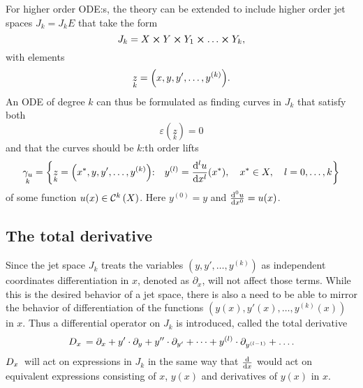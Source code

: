 For higher order ODE:s, the theory can be extended to include higher order jet spaces \(J_k = J_k E\) that take the form
\begin{equation}
  J_k = X \cross Y \cross Y_1 \cross \dots \cross Y_k,
\end{equation}
with elements
\begin{equation}
  \underset{k}{z} = \qty(x, y, y', \dots, y^{(k)}).
\end{equation}
An ODE of degree \(k\) can thus be formulated as finding curves in \(J_k\) that satisfy both
\begin{equation}
  \varepsilon(\underset{k}{z}) = 0
\end{equation}
and that the curves should be \(k\):th order lifts
\begin{equation}
  \underset{k}{\gamma_u} = \qty{\underset{k}{z} = \qty(\fixed{x}, y, y', \dots, y^{(k)})\qq*{:} y^{(l)} = \dv[l]{u}{x}{(\fixed{x})}\qc \fixed{x} \in X\qc l = 0, \dots, k}
\end{equation}
of some function \(u(x) \in \cont{k}{X}\).
Here \(y^{(0)} = y\) and \(\dv[0]{u}{x} = u(x)\).

\subsection{The total derivative}

Since the jet space \(J_k\) treats the variables \((y, y', \dots, y^{(k)})\) as independent coordinates differentiation in \(x\), denoted as \(\partial_x\), will not affect those terms.
While this is the desired behavior of a jet space, there is also a need to be able to mirror the behavior of differentiation of the functions \((y(x), y'(x), \dots, y^{(k)}(x))\) in \(x\).
Thus a differential operator on \(J_k\) is introduced, called the total derivative
\begin{equation}
  D_{x}\, = \partial_x + y' \cdot \partial_y + y'' \cdot \partial_{y'} + \dots + y^{(l)} \cdot \partial_{y^{(l-1)}} + \dots .
\end{equation}
\(D_{x}\,\) will act on expressions in \(J_k\) in the same way that \(\dv{x}\) would act on equivalent expressions consisting of \(x\), \(y(x)\) and derivatives of \(y(x)\) in \(x\).


